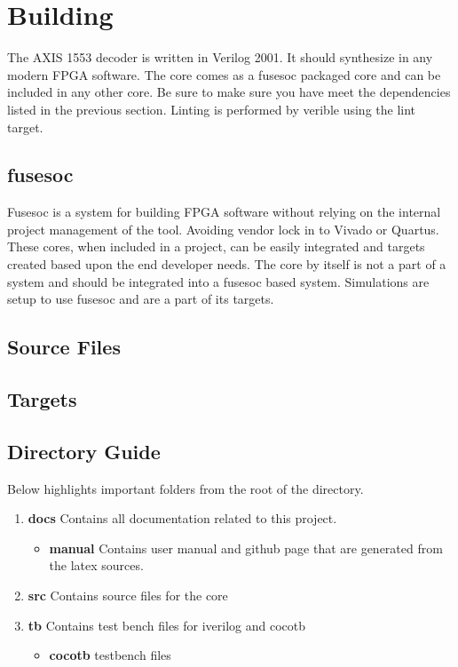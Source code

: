 \section{Building}

\par
The AXIS 1553 decoder is written in Verilog 2001. It should synthesize in any modern FPGA software. The core comes as a fusesoc packaged core and can be included in any other core. Be sure to make sure you have meet the dependencies listed in the previous section. Linting is performed by verible using the lint target.

\subsection{fusesoc}
\par
Fusesoc is a system for building FPGA software without relying on the internal project management of the tool. Avoiding vendor lock in to Vivado or Quartus.
These cores, when included in a project, can be easily integrated and targets created based upon the end developer needs. The core by itself is not a part of
a system and should be integrated into a fusesoc based system. Simulations are setup to use fusesoc and are a part of its targets.

\subsection{Source Files}



\subsection{Targets}



\subsection{Directory Guide}

\par
Below highlights important folders from the root of the directory.

\begin{enumerate}
  \item \textbf{docs} Contains all documentation related to this project.
    \begin{itemize}
      \item \textbf{manual} Contains user manual and github page that are generated from the latex sources.
    \end{itemize}
  \item \textbf{src} Contains source files for the core
  \item \textbf{tb} Contains test bench files for iverilog and cocotb
    \begin{itemize}
      \item \textbf{cocotb} testbench files
    \end{itemize}
\end{enumerate}

